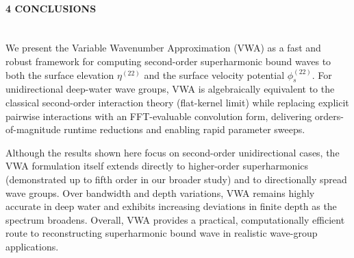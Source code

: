 \documentclass[11pt,letter]{article}
\begin{document}
\paragraph{4 CONCLUSIONS}$\quad$\\


We present the Variable Wavenumber Approximation (VWA) as a fast and robust framework for computing second-order superharmonic bound waves to both the surface elevation $\eta^{(22)}$ and the surface velocity potential $\phi_s^{(22)}$. For unidirectional deep-water wave groups, VWA is algebraically equivalent to the classical second-order interaction theory (flat-kernel limit) while replacing explicit pairwise interactions with an FFT-evaluable convolution form, delivering orders-of-magnitude runtime reductions and enabling rapid parameter sweeps.

Although the results shown here focus on second-order unidirectional cases, the VWA formulation itself extends directly to higher-order superharmonics (demonstrated up to fifth order in our broader study) and to directionally spread wave groups. Over bandwidth and depth variations, VWA remains highly accurate in deep water and exhibits increasing deviations in finite depth as the spectrum broadens. Overall, VWA provides a practical, computationally efficient route to reconstructing superharmonic bound wave in realistic wave-group applications.
\begingroup
\small

\endgroup
\end{document}
